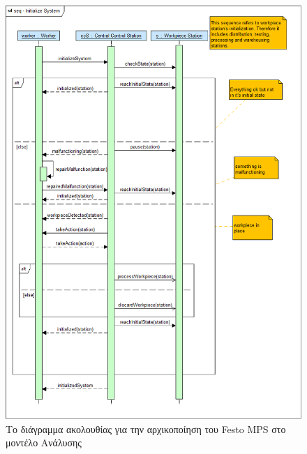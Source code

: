 \documentclass[a4paper,12pt,twoside]{report}
\begin{document}
\begin{appendices}
			\begin{figure}[hp]
					\centering
					\includegraphics[scale=0.30]{AnalysisModel_seq-InitializeSystem.png}
					\caption{Το διάγραμμα ακολουθίας για την αρχικοποίηση του Festo MPS στο μοντέλο Ανάλυσης}
					\label{φωτ:Το διάγραμμα ακολουθίας για την αρχικοποίηση του Festo MPS στο μοντέλο Ανάλυσης}
			\end{figure}
			

\end{appendices}
\end{document}
